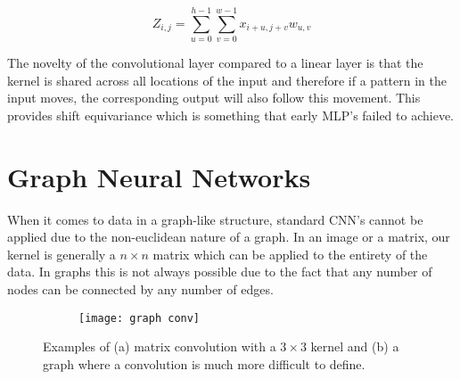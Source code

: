 \documentclass[honours,12pt]{unswthesis}
\numberwithin{equation}{section}
\begin{document}
\begin{equation}
    Z_{i, j} = \sum_{u=0}^{h-1}\sum_{v=0}^{w-1} x_{i+u, j+v} w_{u, v}
\end{equation}

\noindent The novelty of the convolutional layer compared to a linear layer is that the kernel is shared across all locations of the input and therefore
if a pattern in the input moves, the corresponding output will also follow this movement. This provides shift equivariance which is something that early MLP's
failed to achieve.\cite{pml1Book}

\section{Graph Neural Networks}\label{gnn}
When it comes to data in a graph-like structure, standard CNN's cannot be applied due to the non-euclidean nature of a graph.
In an image or a matrix, our kernel is generally a $n\times n$ matrix which can be applied to the entirety of the data. In graphs
this is not always possible due to the fact that any number of nodes can be connected by any number of edges.\cite{sanchez-lengeling2021a} \\

\begin{figure}[H]
    \centering
    \begin{subfigure}{\textwidth}
        \centering
        \caption{ }
        \label{fig:matrix_convolution}
    \end{subfigure}
    \hspace{3pt}
    \begin{subfigure}{.5\textwidth}
        \centering
        \texttt{[image: graph conv]}
        \caption{ }
        \label{fig:graph_convolution}
    \end{subfigure}
    \caption{Examples of (a) matrix convolution with a $3\times 3$ kernel and (b) a graph where a convolution is much more difficult to define.}
    \label{fig:graph_conv_difficulty}
\end{figure}
\end{document}

